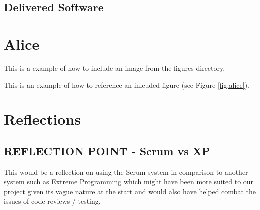 \documentclass{l3proj}
\begin{document}

\subsection{Delivered Software}
\label{finsoftware}

\newpage


\section{Alice}
\label{sec:alice}

This is a example of how to include an image from the figures directory.



This is an example of how to reference an inlcuded figure (see Figure \ref{fig:alice}).

\section{Reflections}
\label{sec:reflections}


\subsection{REFLECTION POINT - Scrum vs XP}
\label{scrumvsxp}
This would be a reflection on using the Scrum system in comparison to another system such as Extreme Programming which might have been more suited to our project given its vague nature at the start and would also have helped combat the issues of code reviews / testing.
\end{document}
